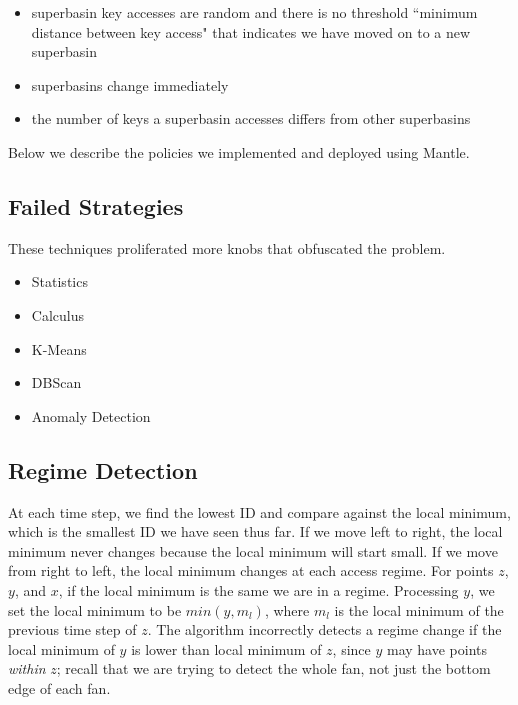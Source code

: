 \begin{itemize}

  \item superbasin key accesses are random and there is no threshold ``minimum distance
  between key access" that indicates we have moved on to a new superbasin

  \item superbasins change immediately

  \item the number of keys a superbasin accesses differs from other superbasins

\end{itemize}

Below we describe the policies we implemented and deployed using Mantle. 

\subsection{Failed Strategies}
These techniques proliferated more knobs that obfuscated the problem. 
\begin{itemize}
  \item Statistics
  \item Calculus
  \item K-Means
  \item DBScan
  \item Anomaly Detection
\end{itemize}

\subsection{Regime Detection}
\label{sec:regime-detection}

At each time step, we find the lowest ID and compare against the local minimum,
which is the smallest ID we have seen thus far. If we move left to right, the
local minimum never changes because the local minimum will start small. If we
move from right to left, the local minimum changes at each access regime.  For
points \(z\), \(y\), and \(x\), if the local minimum is the same we are in a
regime. Processing \(y\), we set the local minimum to be \(min(y, m_l)\), where
\(m_l\) is the local minimum of the previous time step of \(z\). The algorithm
incorrectly detects a regime change if the local minimum of \(y\) is lower than
local minimum of \(z\), since \(y\) may have points {\it within} \(z\); recall
that we are trying to detect the whole fan, not just the bottom edge of each
fan.


